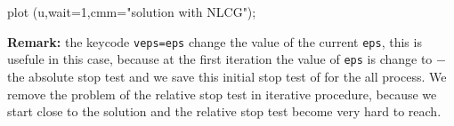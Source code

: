 \documentclass[twoside]{book}
\begin{document}
   plot (u,wait=1,cmm="solution with NLCG");
\eFF

{\bf Remark:} the keycode  \texttt{veps=eps} change the value of the current \texttt{eps}, this is
usefule in this case, because at the first iteration  the value of \texttt{eps} is change 
to $-$ the absolute stop test and we save this initial stop test of for the all process. We remove the problem
of the relative stop test in iterative procedure, because we start close to the solution
and  the relative stop test become very hard  to reach.
\end{document}
